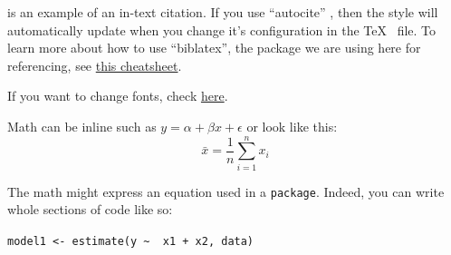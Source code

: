 \documentclass[12pt,a4paper]{article}
\begin{document}
\textcite{Hollway:2017ke} is an example of an in-text citation. If you use ``autocite'' \autocite{Hollway:2017ke}, then the style will automatically update when you change it's configuration in the \TeX~ file. To learn more about how to use ``biblatex'', the package we are using here for referencing, see \href{http://tug.ctan.org/info/biblatex-cheatsheet/biblatex-cheatsheet.pdf}{this cheatsheet}.

If you want to change fonts, check \href{https://www.tug.org/pracjourn/2006-1/schmidt/schmidt.pdf}{here}.

Math can be inline such as $ y = \alpha + \beta x + \epsilon $ or look like this: $$ \bar{x} = \frac{1}{n} \sum_{i=1}^{n}x_i $$

The math might express an equation used in a \texttt{package}. Indeed, you can write whole sections of code like so:

\texttt{model1 <- estimate(y \textasciitilde~ x1 + x2, data)}
	
\newpage
\printbibliography
\end{document}
